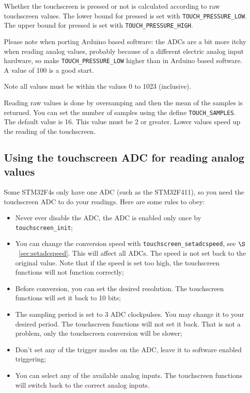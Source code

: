 \documentclass[12pt]{article}
\begin{document}
Whether the touchscreen is pressed or not is calculated according to raw touchscreen values. The lower bound for pressed is set with \lstinline|TOUCH_PRESSURE_LOW|. The upper bound for pressed is set with \lstinline|TOUCH_PRESSURE_HIGH|.

Please note when porting Arduino based software: the ADCs are a bit more itchy when reading analog values, probably because of a different electric analog input hardware, so make \lstinline|TOUCH_PRESSURE_LOW| higher than in Arduino based software. A value of 100 is a good start.

Note all values must be within the values 0 to 1023 (inclusive).

Reading raw values is done by oversamping and then the mean of the samples is returned. You can set the number of samples using the define \lstinline|TOUCH_SAMPLES|. The default value is 16. This value must be 2 or greater. Lower values speed up the reading of the touchscreen.

\subsection{Using the touchscreen ADC for reading analog values}
Some STM32F4s only have one ADC (such as the STM32F411), so you need the touchscreen ADC to do your readings. Here are some rules to obey:

\begin{itemize}
\item Never ever disable the ADC, the ADC is enabled only once by \lstinline|touchscreen_init|;
\item You can change the conversion speed with \lstinline|touchscreen_setadcspeed|, see $\S$~\ref{sec:setadcspeed}. This will affect all ADCs. The speed is not set back to the original value. Note that if the speed is set too high, the touchscreen functions will not function correctly;
\item Before conversion, you can set the desired resolution. The touchscreen functions will set it back to 10 bits;
\item The sampling period is set to 3 ADC clockpulses. You may change it to your desired period. The touchscreen functions will not set it back. That is not a problem, only the touchscreen conversion will be slower;
\item Don't set any of the trigger modes on the ADC, leave it to software enabled triggering;
\item You can select any of the available analog inputs. The touchscreen functions will switch back to the correct analog inputs. 
\end{itemize}
\end{document}
